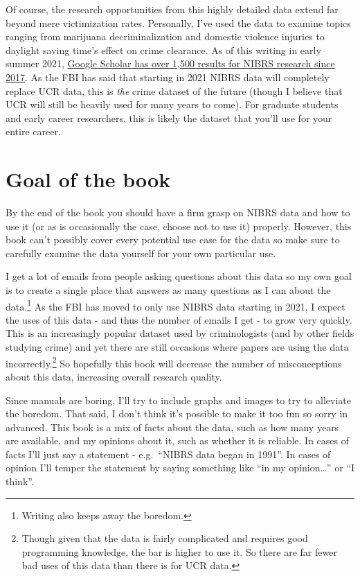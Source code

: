 \documentclass[
  12pt,
  openany]{book}
\begin{document}
Of course, the research opportunities from this highly detailed data extend far beyond mere victimization rates. Personally, I've used the data to examine topics ranging from marijuana decriminalization and domestic violence injuries to daylight saving time's effect on crime clearance. As of this writing in early summer 2021, \href{https://scholar.google.com/scholar?as_ylo=2017\&q=NIBRS\&hl=en\&as_sdt=0,44}{Google Scholar has over 1,500 results for NIBRS research since 2017}. As the FBI has said that starting in 2021 NIBRS data will completely replace UCR data, this is \emph{the} crime dataset of the future (though I believe that UCR will still be heavily used for many years to come). For graduate students and early career researchers, this is likely the dataset that you'll use for your entire career.

\hypertarget{goal-of-the-book}{%
\section{Goal of the book}\label{goal-of-the-book}}

By the end of the book you should have a firm grasp on NIBRS data and how to use it (or as is occasionally the case, choose not to use it) properly. However, this book can't possibly cover every potential use case for the data so make sure to carefully examine the data yourself for your own particular use.

I get a lot of emails from people asking questions about this data so my own goal is to create a single place that answers as many questions as I can about the data.\footnote{Writing also keeps away the boredom.} As the FBI has moved to only use NIBRS data starting in 2021, I expect the uses of this data - and thus the number of emails I get - to grow very quickly. This is an increasingly popular dataset used by criminologists (and by other fields studying crime) and yet there are still occasions where papers are using the data incorrectly.\footnote{Though given that the data is fairly complicated and requires good programming knowledge, the bar is higher to use it. So there are far fewer bad uses of this data than there is for UCR data.} So hopefully this book will decrease the number of misconceptions about this data, increasing overall research quality.

Since manuals are boring, I'll try to include graphs and images to try to alleviate the boredom. That said, I don't think it's possible to make it too fun so sorry in advanced. This book is a mix of facts about the data, such as how many years are available, and my opinions about it, such as whether it is reliable. In cases of facts I'll just say a statement - e.g.~``NIBRS data began in 1991''. In cases of opinion I'll temper the statement by saying something like ``in my opinion\ldots{}'' or ``I think''.
\end{document}
